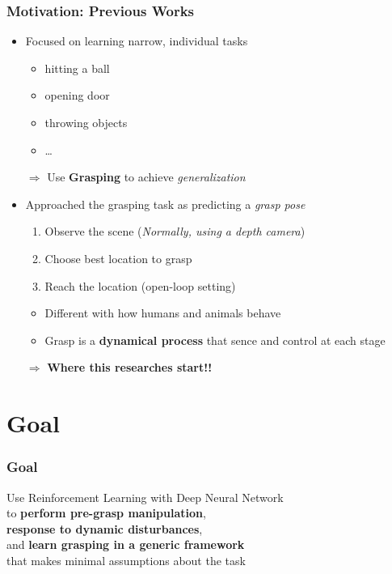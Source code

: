 \documentclass{beamer}
\newcommand{\firstSec}{Motivation}
\newcommand{\secondSec}{Goal}
\begin{document}
    \begin{frame}
      \frametitle{\firstSec : Previous Works}
      \begin{itemize}
        \item Focused on learning narrow, individual tasks
        \begin{itemize}
          \item hitting a ball
          \item opening door
          \item throwing objects
          \item \ldots
        \end{itemize}
        \pause
      \end{itemize}
      \begin{itemize}
        \setlength{\itemindent}{.3in}
        \item[$\Rightarrow$] Use \textbf{Grasping} to achieve \textit{generalization}
      \end{itemize}
      \pause
      \begin{itemize}
        \item Approached the grasping task as predicting a \textit{grasp pose}
        \begin{enumerate}
          \item Observe the scene (\textit{Normally, using a depth camera})
          \item Choose best location to grasp
          \item Reach the location (open-loop setting)
        \end{enumerate}
        \pause
        \begin{itemize}
          \item Different with how humans and animals behave
          \item Grasp is a \textbf{dynamical process} that sence and control at each stage
        \end{itemize}
      \end{itemize}
      \pause
      \begin{itemize}
        \setlength{\itemindent}{.3in}
        \item[$\Rightarrow$] \textbf{Where this researches start!!}
      \end{itemize}
    \end{frame}


  \section{\secondSec}
  \begin{frame}
    \frametitle{\secondSec}
    \centering
    \Large{Use Reinforcement Learning with Deep Neural Network\\
           to \textbf{perform pre-grasp manipulation}, \\
           \textbf{response to dynamic disturbances}, \\
           and \textbf{learn grasping in a generic framework} \\
           that makes minimal assumptions about the task}
  \end{frame}
\end{document}
